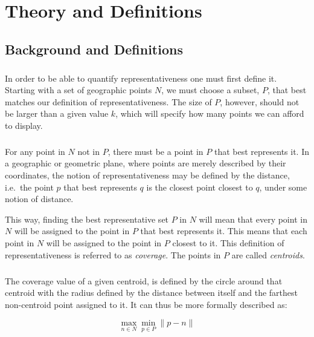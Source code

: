 \chapter{Theory and Definitions}
\label{chap:theory}


\section{Background and Definitions}
\label{sect:problem}
\paragraph{}
In order to be able to quantify representativeness one must first define it. 
Starting with a set of geographic points $N$, we must choose a subset, $P$, that best matches our definition of representativeness. The size of $P$, however, should not be larger than a given value $k$, which will specify how many points we can afford to display.

\paragraph{}
For any point in $N$ not in $P$, there must be a point in $P$ that best represents it. In a geographic or geometric plane, where points are merely described by their coordinates, the notion of representativeness may be defined by the distance, i.e.\ the point $p$ that best represents $q$ is the closest point closest to $q$, under some notion of distance. 

This way, finding the best representative set $P$ in $N$ will mean that every point in $N$ will be assigned to the point in $P$ that best represents it. This means that each point in $N$ will be assigned to the point in $P$ closest to it. This definition of representativeness is referred to as \textit{coverage}. The points in $P$ are called \textit{centroids}.

\paragraph{}
The coverage value of a given centroid, is defined by the circle around that centroid with the radius defined by the distance between itself and the farthest non-centroid point assigned to it. It can thus be more formally described as:

\begin{equation}
\max_{n \in N}
	{\min_{p \in P}
		{\lVert p-n \rVert}
	}
\end{equation}

